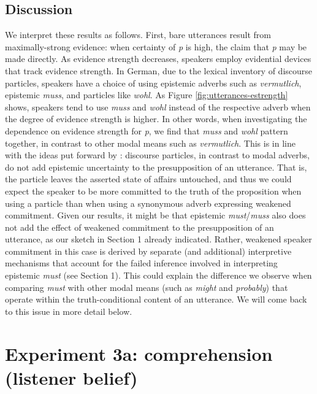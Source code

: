 \documentclass[11pt]{article}
\newcommand{\figref}[1]{Figure \ref{#1}}
\begin{document}
\subsection{Discussion}
We interpret these results as follows. First, bare utterances result from maximally-strong evidence: when certainty of \emph{p} is high, the claim that \emph{p} may be made directly. As evidence strength decreases, speakers employ evidential devices that track evidence strength. In German, due to the lexical inventory of discourse particles, speakers have a choice of using epistemic adverbs such as \emph{vermutlich}, epistemic \emph{muss}, and particles like \emph{wohl}. As \figref{fig:utterances-estrength} shows, speakers tend to use \emph{muss} and \emph{wohl} instead of the respective adverb when the degree of evidence strength is higher. In other words, when investigating the dependence on evidence strength for \emph{p}, we find that \emph{muss} and \emph{wohl} pattern together, in contrast to other modal means such as \emph{vermutlich}. This is in line with the ideas put forward by \cite{Zimmermann2004, Zimmermann2008}: discourse particles, in contrast to modal adverbs, do not add epistemic uncertainty to the presupposition of an utterance. That is, the particle leaves the asserted state of affairs untouched, and thus we could expect the speaker to be more committed to the truth of the proposition when using a particle than when using a synonymous adverb expressing weakened commitment. Given our results, it might be that epistemic \emph{must}/\emph{muss} also does not add the effect of weakened commitment to the presupposition of an utterance, as our sketch in Section 1 already indicated. Rather, weakened speaker commitment in this case is derived by separate (and additional) interpretive mechanisms that account for the failed inference involved in interpreting epistemic \emph{must} (see Section 1). This could explain the difference we observe when comparing \emph{must} with other modal means (such as \emph{might} and \emph{probably}) that operate within the truth-conditional content of an utterance. We will come back to this issue in more detail below.



\section{Experiment 3a: comprehension (listener belief)}
\end{document}

